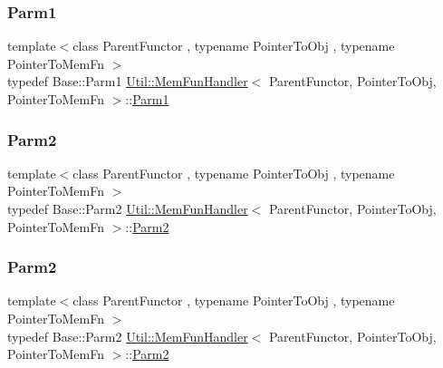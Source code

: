 \subsubsection{\texorpdfstring{Parm1}{Parm1}\hspace{0.1cm}{\footnotesize\ttfamily [2/2]}}
{\footnotesize\ttfamily template$<$class Parent\+Functor , typename Pointer\+To\+Obj , typename Pointer\+To\+Mem\+Fn $>$ \\
typedef Base\+::\+Parm1 \mbox{\hyperlink{classUtil_1_1MemFunHandler}{Util\+::\+Mem\+Fun\+Handler}}$<$ Parent\+Functor, Pointer\+To\+Obj, Pointer\+To\+Mem\+Fn $>$\+::\mbox{\hyperlink{classUtil_1_1MemFunHandler_a43182733677fc623d89e5613ecf15761}{Parm1}}}

\mbox{\label{classUtil_1_1MemFunHandler_a9d454c62047cb4bff3173b5bda9a38c8}} 
\subsubsection{\texorpdfstring{Parm2}{Parm2}\hspace{0.1cm}{\footnotesize\ttfamily [1/2]}}
{\footnotesize\ttfamily template$<$class Parent\+Functor , typename Pointer\+To\+Obj , typename Pointer\+To\+Mem\+Fn $>$ \\
typedef Base\+::\+Parm2 \mbox{\hyperlink{classUtil_1_1MemFunHandler}{Util\+::\+Mem\+Fun\+Handler}}$<$ Parent\+Functor, Pointer\+To\+Obj, Pointer\+To\+Mem\+Fn $>$\+::\mbox{\hyperlink{classUtil_1_1MemFunHandler_a9d454c62047cb4bff3173b5bda9a38c8}{Parm2}}}

\mbox{\label{classUtil_1_1MemFunHandler_a9d454c62047cb4bff3173b5bda9a38c8}} 
\subsubsection{\texorpdfstring{Parm2}{Parm2}\hspace{0.1cm}{\footnotesize\ttfamily [2/2]}}
{\footnotesize\ttfamily template$<$class Parent\+Functor , typename Pointer\+To\+Obj , typename Pointer\+To\+Mem\+Fn $>$ \\
typedef Base\+::\+Parm2 \mbox{\hyperlink{classUtil_1_1MemFunHandler}{Util\+::\+Mem\+Fun\+Handler}}$<$ Parent\+Functor, Pointer\+To\+Obj, Pointer\+To\+Mem\+Fn $>$\+::\mbox{\hyperlink{classUtil_1_1MemFunHandler_a9d454c62047cb4bff3173b5bda9a38c8}{Parm2}}}

